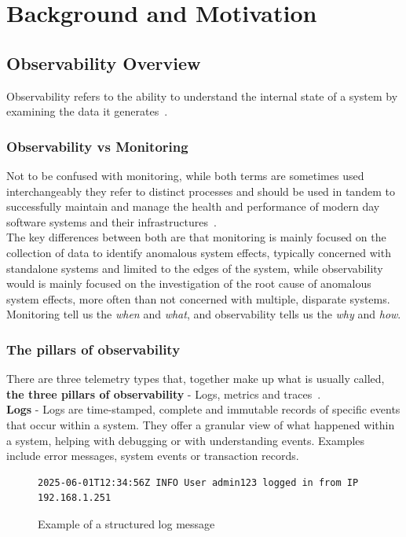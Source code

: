 %
%
\chapter{Background and Motivation} \label{ch:background}


\section{Observability Overview}\label{sec:observability-overview}
Observability refers to the ability to understand the internal state of a system by examining the data it generates~\cite{ibm_observability}.\\

\subsection{Observability vs Monitoring}\label{subsec:observability-vs-monitoring}
Not to be confused with monitoring, while both terms are sometimes used interchangeably they refer to distinct
processes and should be used in tandem to successfully maintain and manage the health and performance of modern day
software systems and their infrastructures~\cite{aws_observability_vs_monitoring}.\\

The key differences between both are that monitoring is mainly focused on the collection of data to identify
anomalous system effects, typically concerned with standalone systems and limited to the edges of the system, while
observability would is mainly focused on the investigation of the root cause of anomalous system effects, more often
than not concerned with multiple, disparate systems.
Monitoring tell us the \textit{when} and \textit{what}, and observability tells us the \textit{why} and \textit{how}.\\

\subsection{The pillars of observability}\label{subsec:the-pillars-of-observability}
There are three telemetry types that, together make up what is usually called,
\textbf{the three pillars of observability} - Logs, metrics and traces~\cite{ibm_observability}.\\

\textbf{Logs} - Logs are time-stamped, complete and immutable records of specific events that occur within a system.
They offer a granular view of what happened within a system, helping with debugging or with understanding
events.
Examples include error messages, system events or transaction records.\\
\begin{figure}[h]
    \centering
    \begin{lstlisting}
2025-06-01T12:34:56Z INFO User admin123 logged in from IP 192.168.1.251
    \end{lstlisting}
    \caption{Example of a structured log message}
\end{figure}


